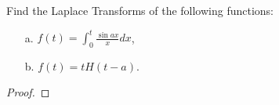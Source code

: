 \begin{problem}{2}
  Find the Laplace Transforms of the following functions:
  \begin{enumerate}
    \item[a.] $\displaystyle f(t) = \int_0^t \frac{\sin ax}{x} dx$,
    \item[b.] $f(t) = t H(t-a)$.
  \end{enumerate}
\end{problem}

\begin{proof}
\end{proof}
\newpage

